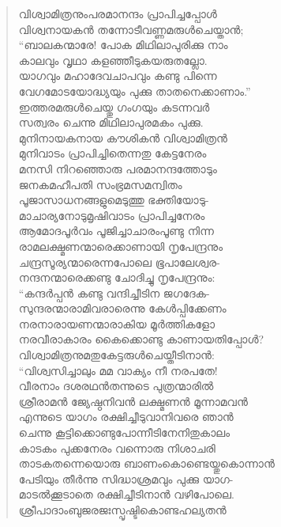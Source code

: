 \begin{verse}
വിശ്വാമിത്രനുംപരമാനന്ദം പ്രാപിച്ചപ്പോള്‍\\
വിശ്വനായകന്‍ തന്നോടീവണ്ണമരുള്‍ചെയ്താന്‍;\\
“ബാലകന്മാരേ! പോക മിഥിലാപുരിക്കു നാം\\
കാലവും വൃഥാ കളഞ്ഞീടുകയരുതല്ലോ.\\
യാഗവും മഹാദേവചാപവും കണ്ടു പിന്നെ\\
വേഗമോടയോദ്ധ്യയും പുക്കു താതനെക്കാണാം.”\\
ഇത്തരമരുള്‍ചെയ്തു ഗംഗയും കടന്നവര്‍\\
സത്വരം ചെന്നു മിഥിലാപുരമകം പുക്കു.\\
മുനിനായകനായ കൗശികന്‍ വിശ്വാമിത്രന്‍\\
മുനിവാടം പ്രാപിച്ചിതെന്നതു കേട്ടനേരം\\
മനസി നിറഞ്ഞൊരു പരമാനന്ദത്തോടും\\
ജനകമഹീപതി സംഭ്രമസമന്വിതം\\
പൂജാസാധനങ്ങളുമെടുത്തു ഭക്തിയോടു-\\
മാചാര്യനോടുമൃഷിവാടം പ്രാപിച്ചനേരം\\
ആമോദപൂര്‍വം പൂജിച്ചാചാരംപൂണ്ടു നിന്ന\\
രാമലക്ഷ്മണന്മാരെക്കാണായി നൃപേന്ദ്രനും\\
ചന്ദ്രസൂര്യന്മാരെന്നപോലെ ഭൂപാലേശ്വര-\\
നന്ദനന്മാരെക്കണ്ടു ചോദിച്ചു നൃപേന്ദ്രനും:\\
“കന്ദര്‍പ്പന്‍ കണ്ടു വന്ദിച്ചീടിന ജഗദേക-\\
സുന്ദരന്മാരാമിവരാരെന്നു കേള്‍പ്പിക്കേണം\\
നരനാരായണന്മാരാകിയ മൂര്‍ത്തികളോ\\
നരവീരാകാരം കൈക്കൊണ്ടു കാണായതിപ്പോള്‍?\\
വിശ്വാമിത്രനുമതുകേട്ടരുള്‍ചെയ്തീടിനാന്‍:\\
“വിശ്വസിച്ചാലും മമ വാക്യം നീ നരപതേ!\\
വീരനാം ദശരഥന്‍തന്നുടെ പുത്രന്മാരില്‍\\
ശ്രീരാമന്‍ ജ്യേഷ്ഠനിവന്‍ ലക്ഷ്മണന്‍ മൂന്നാമവന്‍\\
എന്നുടെ യാഗം രക്ഷിച്ചീടുവാനിവരെ ഞാന്‍\\
ചെന്നു കൂട്ടിക്കൊണ്ടുപോന്നീടിനേനിതുകാലം\\
കാടകം പുക്കനേരം വന്നൊരു നിശാചരി\\
താടകതന്നെയൊരു ബാണംകൊണ്ടെയ്തുകൊന്നാന്‍\\
പേടിയും തീര്‍ന്നു സിദ്ധാശ്രമവും പുക്കു യാഗ-\\
മാടല്‍ക്കൂടാതെ രക്ഷിച്ചീടിനാന്‍ വഴിപോലെ.\\
ശ്രീപാദാംബുജരജഃസ്പൃഷ്ടികൊണ്ടഹല്യതന്‍\\

\end{verse}
